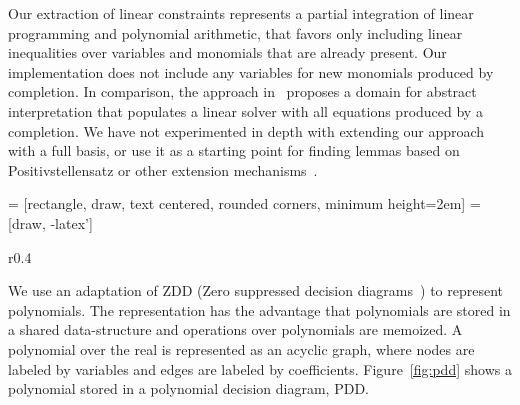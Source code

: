 Our extraction of linear constraints represents a partial integration of linear programming and polynomial arithmetic,
that favors only including linear inequalities over variables and monomials that are already present. Our implementation
does not include any variables for new monomials produced by completion.
In comparison, the approach in~\cite{DBLP:journals/pacmpl/KincaidKZ23} proposes a domain for abstract interpretation that populates a linear
solver with all equations produced by a completion. We have not experimented in depth with extending our approach with a full basis,
or use it as a starting point for finding lemmas based on Positivstellensatz or other extension mechanisms~\cite{DBLP:conf/csl/Tiwari05,DBLP:conf/cade/PlatzerQR09}.





\usetikzlibrary{shapes,arrows}
\usetikzlibrary{positioning}

 = [rectangle, draw, text centered, rounded corners, minimum height=2em]
 = [draw, -latex']

\begin{wrapfigure}{r}{0.4\textwidth} 
  \begin{center}

  \end{center}
  \vspace{1pt}
  \caption{PDD representation of $5x^2y + xy + y + x + 1$\label{fig:pdd}}
\end{wrapfigure}
We use an adaptation of ZDD (Zero suppressed decision diagrams~\cite{Minato93,NishinoYMN16}) to represent polynomials.
The representation has the advantage that polynomials are stored in a shared data-structure and operations
over polynomials are memoized. A polynomial over the real is represented as an acyclic graph, where 
nodes are labeled by variables and edges are labeled by coefficients. Figure~\ref{fig:pdd} shows a polynomial stored
in a polynomial decision diagram, PDD.


